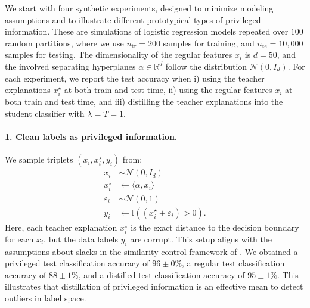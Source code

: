 \documentclass{article}
\begin{document}
We start with four synthetic experiments, designed to minimize modeling
assumptions and to illustrate different prototypical types of privileged
information. These are simulations of logistic regression models repeated over
$100$ random partitions, where we use $n_\text{tr} = 200$ samples for training,
and $n_\text{te} = 10,000$ samples for testing.  The dimensionality of the
regular features $x_i$ is $d=50$, and the involved separating hyperplanes
$\alpha \in \mathbb{R}^d$ follow the distribution $\mathcal{N}(0,I_d)$.  For each
experiment, we report the test accuracy when i) using the teacher explanations
$x^\star_i$ at both train and test time, ii) using the regular features $x_i$
at both train and test time, and iii) distilling the teacher explanations into
the student classifier with $\lambda = T = 1$. 

\paragraph{1. Clean labels as privileged information.} We sample triplets $(x_i,
x^\star_i, y_i)$ from:
\begin{align*}
  x_i       &\sim \mathcal{N}(0,I_d)\\
  x^\star_i &\leftarrow \langle \alpha, x_i \rangle\\
  \varepsilon_i &\sim \mathcal{N}(0,1)\\
  y_i       &\leftarrow \mathbb{I}((x^\star_i + \varepsilon_i) > 0).
\end{align*}
Here, each teacher explanation $x^\star_i$ is the exact distance to the
decision boundary for each $x_i$, but the data labels $y_i$ are corrupt. This
setup aligns with the assumptions about slacks in the similarity control
framework of \citet{Vapnik09}. We obtained a privileged test classification
accuracy of $96 \pm 0\%$, a regular test classification accuracy of $88\pm
1\%$, and a distilled test classification accuracy of $95\pm
1\%$. This illustrates that distillation of privileged information is an
effective mean to detect outliers in label space.
\end{document}
